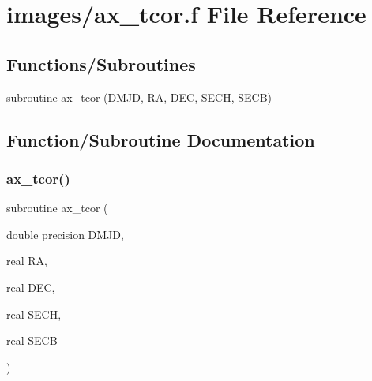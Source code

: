 \hypertarget{ax__tcor_8f}{}\section{images/ax\+\_\+tcor.f File Reference}
\label{ax__tcor_8f}
\subsection*{Functions/\+Subroutines}
\begin{DoxyCompactItemize}
\item 
subroutine \hyperlink{ax__tcor_8f_a56d741b67d32329972f5337bc94e3fef}{ax\+\_\+tcor} (D\+M\+JD, RA, D\+EC, S\+E\+CH, S\+E\+CB)
\end{DoxyCompactItemize}


\subsection{Function/\+Subroutine Documentation}
\mbox{\label{ax__tcor_8f_a56d741b67d32329972f5337bc94e3fef}} 
\subsubsection{\texorpdfstring{ax\+\_\+tcor()}{ax\_tcor()}}
{\footnotesize\ttfamily subroutine ax\+\_\+tcor (\begin{DoxyParamCaption}\item[{double precision}]{D\+M\+JD,  }\item[{real}]{RA,  }\item[{real}]{D\+EC,  }\item[{real}]{S\+E\+CH,  }\item[{real}]{S\+E\+CB }\end{DoxyParamCaption})}

